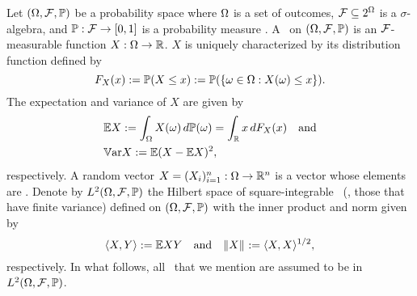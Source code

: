 Let $(\Omega, \mathcal{F}, \mathbb{P})$ be a probability space where $\Omega$ is a set of
outcomes, $\mathcal{F} \subseteq 2^\Omega$ is a $\sigma$-algebra, and
$\mathbb{P}: \mathcal{F} \to [0, 1]$ is a probability measure
\cite{durrett2010}. A \rv\ on $(\Omega, \mathcal{F}, \mathbb{P})$ is an
$\mathcal{F}$-measurable function $X: \Omega \to \mathbb{R}$. $X$ is uniquely
characterized by its distribution function defined by
\begin{equation*}
  F_X(x) := \mathbb{P}(X \leq x) := \mathbb{P}(\{ \omega \in \Omega: X(\omega) \leq x \}).
\end{equation*}
The expectation and variance of $X$ are given by
\begin{align*}
  & \mathbb{E} X := \int_\Omega X(\omega) \, d\mathbb{P}(\omega) = \int_{\mathbb{R}} x \, d F_X(x) \hspace{1em} \text{and} \\
  & \mathbb{V}\text{ar} X := \mathbb{E} (X - \mathbb{E} X)^2,
\end{align*}
respectively. A random vector $X = (X_i)_{i = 1}^n: \Omega \to \mathbb{R}^n$ is a
vector whose elements are \rvs. Denote by $L^{2}(\Omega, \mathcal{F}, \mathbb{P})$ the Hilbert
space of square-integrable \rvs\ (\ie, those that have finite variance) defined
on $(\Omega, \mathcal{F}, \mathbb{P})$ with the inner product and norm given by
\begin{equation*}
  \langle X, Y \rangle := \mathbb{E} X Y \hspace{1em} \text{and} \hspace{1em} \| X \|_{} := \langle X, X \rangle^{1/2},
\end{equation*}
respectively. In what follows, all \rvs\ that we mention are assumed to be in
$L^{2}(\Omega, \mathcal{F}, \mathbb{P})$.

